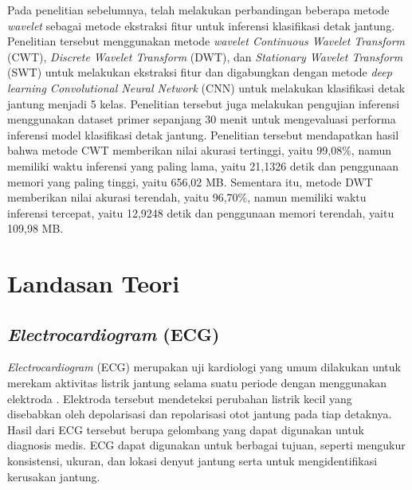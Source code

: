 Pada penelitian sebelumnya, \textcite{sururiComparisonSeveralWavelet2023} telah melakukan perbandingan beberapa metode \textit{wavelet} sebagai metode ekstraksi fitur untuk inferensi klasifikasi detak jantung. 
Penelitian tersebut menggunakan metode \textit{wavelet Continuous Wavelet Transform} (CWT), \textit{Discrete Wavelet Transform} (DWT), dan \textit{Stationary Wavelet Transform} (SWT) untuk melakukan ekstraksi fitur dan digabungkan dengan metode \textit{deep learning Convolutional Neural Network} (CNN) untuk melakukan klasifikasi detak jantung menjadi 5 kelas.
Penelitian tersebut juga melakukan pengujian inferensi menggunakan dataset primer sepanjang 30 menit untuk mengevaluasi performa inferensi model klasifikasi detak jantung.
Penelitian tersebut mendapatkan hasil bahwa metode CWT memberikan nilai akurasi tertinggi, yaitu 99,08\%, namun memiliki waktu inferensi yang paling lama, yaitu 21,1326 detik dan penggunaan memori yang paling tinggi, yaitu 656,02 MB.
Sementara itu, metode DWT memberikan nilai akurasi terendah, yaitu 96,70\%, namun memiliki waktu inferensi tercepat, yaitu 12,9248 detik dan penggunaan memori terendah, yaitu 109,98 MB.


\section{Landasan Teori}





\subsection{\emph{Electrocardiogram} (ECG)}
\label{subsec: landasan-ecg}

\textit{Electrocardiogram} (ECG) merupakan uji kardiologi yang umum dilakukan untuk merekam aktivitas listrik jantung selama suatu periode dengan menggunakan elektroda \parencite{yoonDeepLearningbasedElectrocardiogram2019}.
Elektroda tersebut mendeteksi perubahan listrik kecil yang disebabkan oleh depolarisasi dan repolarisasi otot jantung pada tiap detaknya.
Hasil dari ECG tersebut berupa gelombang yang dapat digunakan untuk diagnosis medis.
ECG dapat digunakan untuk berbagai tujuan, seperti mengukur konsistensi, ukuran, dan lokasi denyut jantung serta untuk mengidentifikasi kerusakan jantung.


